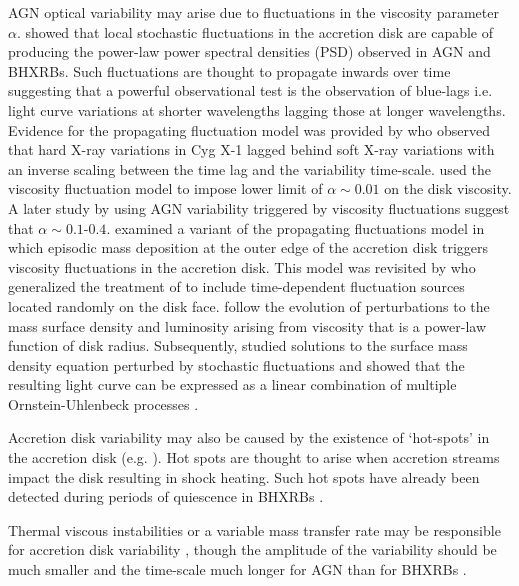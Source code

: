 \documentclass[a4paper,fleqn,usenatbib]{mnras}
\begin{document}
AGN optical variability may arise due to fluctuations in the \citet{ShakuraSunyaev73} viscosity parameter $\alpha$. \citet{Lyubarskii97} showed that local stochastic fluctuations in the accretion disk are capable of producing the power-law power spectral densities (PSD) observed in AGN and BHXRBs. Such fluctuations are thought to propagate inwards over time suggesting that a powerful observational test is the observation of blue-lags \citep{UttleyAccretion} i.e. light curve variations at shorter wavelengths lagging those at longer wavelengths. Evidence for the propagating fluctuation model was provided by \citet{Miyamoto88} who observed that hard X-ray variations in Cyg X-1 lagged behind soft X-ray variations with an inverse scaling between the time lag and the variability time-scale. \citet{Starling04} used the viscosity fluctuation model to impose lower limit of $\alpha \sim 0.01$ on the disk viscosity. A later study by \citet{King07} using AGN variability triggered by viscosity fluctuations suggest that $\alpha \sim 0.1$-$0.4$. \citet{Wood01} examined a variant of the \citet{Lyubarskii97} propagating fluctuations model in which episodic mass deposition at the outer edge of the accretion disk triggers viscosity fluctuations in the accretion disk. This model was revisited by \citet{Titarchuk07} who generalized the treatment of \citet{Wood01} to include time-dependent fluctuation sources located randomly on the disk face. \citet{Titarchuk07} follow the evolution of perturbations to the mass surface density and luminosity arising from viscosity that is a power-law function of disk radius. Subsequently, \citet{Kelly11} studied solutions to the surface mass density equation perturbed by stochastic fluctuations and showed that the resulting light curve can be expressed as a linear combination of multiple Ornstein-Uhlenbeck processes \citep{Gillespie96,Kelly09}. 

Accretion disk variability may also be caused by the existence of `hot-spots' in the accretion disk (e.g. \citet{MaccaroneAccretion}). Hot spots are thought to arise when accretion streams impact the disk resulting in shock heating. Such hot spots have already been detected during periods of quiescence in BHXRBs \citep{Froning11,McClintock95}. 

Thermal viscous instabilities or a variable mass transfer rate may be responsible for accretion disk variability \citep{Lasota01,Coriat12}, though the amplitude of the variability should be much smaller and the time-scale much longer for AGN than for BHXRBs \citep{Hameury09}.
\end{document}
